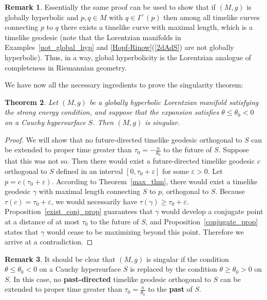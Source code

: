 \documentclass[12pt]{amsart}
\newtheorem{Thm}{Theorem}[section]
\theoremstyle{definition}
\newtheorem{Remark}[Thm]{Remark}
\theoremstyle{remark}
\begin{document}
\begin{Remark}
Essentially the same proof can be used to show that if $(M,g)$ is globally hyperbolic and $p, q \in M$ with $q \in I^+(p)$ then among all timelike curves connecting $p$ to $q$ there exists a timelike curve with maximal length, which is a timelike geodesic (note that the Lorentzian manifolds in Examples~\ref{not_global_hyp} and \ref{Hopf-Rinow}(\ref{2dAdS}) are not globally hyperbolic). Thus, in a way, global hyperbolicity is the Lorentzian analogue of completeness in Riemannian geometry.
\end{Remark}

We have now all the necessary ingredients to prove the singularity theorem:

\begin{Thm} \label{sing_thm}
Let $(M,g)$ be a globally hyperbolic Lorentzian manifold satisfying the strong energy condition, and suppose that the expansion satisfies $\theta\leq\theta_0 < 0$ on a Cauchy hypersurface $S$. Then $(M,g)$ is singular.
\end{Thm}

\begin{proof}
We will show that no future-directed timelike geodesic orthogonal to $S$ can be extended to proper time greater than $\tau_0=-\frac{n}{\theta_0}$ to the future of $S$. Suppose that this was not so. Then there would exist a future-directed timelike geodesic $c$ orthogonal to $S$ defined in an interval $[0,\tau_0+\varepsilon]$ for some $\varepsilon>0$. Let $p=c(\tau_0+\varepsilon)$. According to Theorem~\ref{max_thm}, there would exist a timelike geodesic $\gamma$ with maximal length connecting $S$ to $p$, orthogonal to $S$. Because $\tau(c)=\tau_0+\varepsilon$, we would necessarily have $\tau(\gamma)\geq\tau_0+\varepsilon$. Proposition~\ref{exist_conj_prop} guarantees that $\gamma$ would develop a conjugate point at a distance of at most $\tau_0$ to the future of $S$, and Proposition~\ref{conjugate_prop} states that $\gamma$ would cease to be maximizing beyond this point. Therefore we arrive at a contradiction.
\end{proof}

\begin{Remark}
It should be clear that $(M,g)$ is singular if the condition $\theta\leq\theta_0 < 0$ on a Cauchy hypersurface $S$ is replaced by the condition $\theta\geq\theta_0 > 0$ on $S$. In this case, no {\bf past-directed} timelike geodesic orthogonal to $S$ can be extended to proper time greater than $\tau_0=\frac{n}{\theta_0}$ to the {\bf past} of $S$.
\end{Remark}
\end{document}
